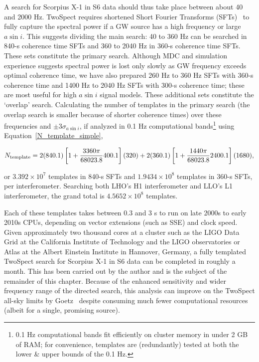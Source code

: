 A search for Scorpius X-1 in S6 data should thus take place between about 40 and 2000 Hz. 
TwoSpect requires shortened Short Fourier Transforms (SFTs)~\cite{GoetzTwoSpectMethods2011} to fully capture the spectral power if a GW source has a high frequency or large $a \sin i$. 
This suggests dividing the main search: 40 to 360 Hz can be searched in 840-s coherence time SFTs and 360 to 2040 Hz in 360-s coherence time SFTs.
These sets constitute the primary search.
Although MDC and simulation experience suggests spectral power is lost only slowly as GW frequency exceeds optimal coherence time, we have also prepared 260 Hz to 360 Hz SFTs with 360-s coherence time and 1400 Hz to 2040 Hz SFTs with 300-s coherence time; these are most useful for high $a \sin i$ signal models.
These additional sets constitute the `overlap' search.
Calculating the number of templates in the primary search (the overlap search is smaller because of shorter coherence times) over these frequencies and $\pm 3 \sigma_{a \sin i}$, if analyzed in 0.1 Hz computational bands\footnote{0.1 Hz computational bands fit efficiently on cluster memory in under 2 GB of RAM; for convenience, templates are (redundantly) tested at both the lower \& upper bounds of the 0.1 Hz.} using Equation~\ref{N_template_simple},

\begin{equation}
N_\textup{template} = 2 (840.1)\left[1+ \frac{3360\pi}{68023.8} 400.1 \right](320) + 2 (360.1)\left[1+ \frac{1440\pi}{68023.8}2400.1\right](1680),
\label{S6_N_templates}
\end{equation}

\noindent or $3.392\times 10^7$ templates in 840-s SFTs and $1.9434\times 10^8$ templates in 360-s SFTs, per interferometer.
Searching both LHO's H1 interferometer and LLO's L1 interferometer, the grand total is $4.5652\times10^8$ templates.

Each of these templates takes between 0.3 and 3 s to run on late 2000s to early 2010s CPUs, depending on vector extensions (such as SSE) and clock speed.
Given approximately two thousand cores at a cluster such as the LIGO Data Grid at the California Institute of Technology and the LIGO observatories or Atlas at the Albert Einstein Institute in Hannover, Germany, a fully templated TwoSpect search for Scorpius X-1 in S6 data can be completed in roughly a month.
This has been carried out by the author and is the subject of the remainder of this chapter.
Because of the enhanced sensitivity and wider frequency range of the directed search, this analysis can improve on the TwoSpect all-sky limits by Goetz~\cite{GoetzTwoSpectResults2014} despite consuming much fewer computational resources (albeit for a single, promising source).

